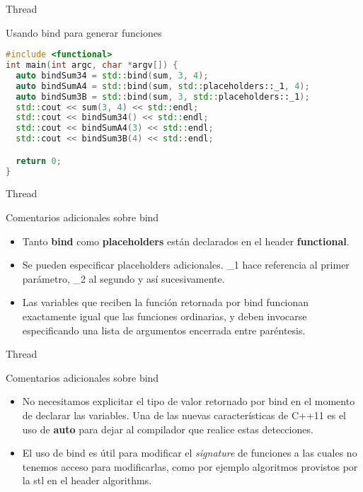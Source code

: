 \begin{frame}[fragile]{Thread}
\begin{block}{Usando bind para generar funciones}
\begin{lstlisting}[language=C++, basicstyle=\small]
#include <functional>
int main(int argc, char *argv[]) {
  auto bindSum34 = std::bind(sum, 3, 4);
  auto bindSumA4 = std::bind(sum, std::placeholders::_1, 4);
  auto bindSum3B = std::bind(sum, 3, std::placeholders::_1);
  std::cout << sum(3, 4) << std::endl;
  std::cout << bindSum34() << std::endl;
  std::cout << bindSumA4(3) << std::endl;
  std::cout << bindSum3B(4) << std::endl;

  return 0;
}
\end{lstlisting}
\end{block}
\end{frame}

\begin{frame}{Thread}
\begin{block}{Comentarios adicionales sobre bind}
\begin{itemize}
  \item Tanto \textbf{bind} como \textbf{placeholders} están declarados en el header \textbf{functional}.
  \item Se pueden especificar placeholders adicionales. \_1 hace referencia al primer parámetro, \_2 al segundo y así sucesivamente.
  \item Las variables que reciben la función retornada por bind funcionan exactamente igual que las funciones ordinarias, y deben invocarse especificando una lista de argumentos encerrada entre paréntesis.
\end{itemize}
\end{block}
\end{frame}

\begin{frame}{Thread}
\begin{block}{Comentarios adicionales sobre bind}
\begin{itemize}
  \item No necesitamos explicitar el tipo de valor retornado por bind en el momento de declarar las variables. Una de las nuevas características de C++11 es el uso de \textbf{auto} para dejar al compilador que realice estas detecciones.
  \item El uso de bind es útil para modificar el \textit{signature} de funciones a las cuales no tenemos acceso para modificarlas, como por ejemplo algoritmos provistos por la stl en el header algorithms.
\end{itemize}
\end{block}
\end{frame}

